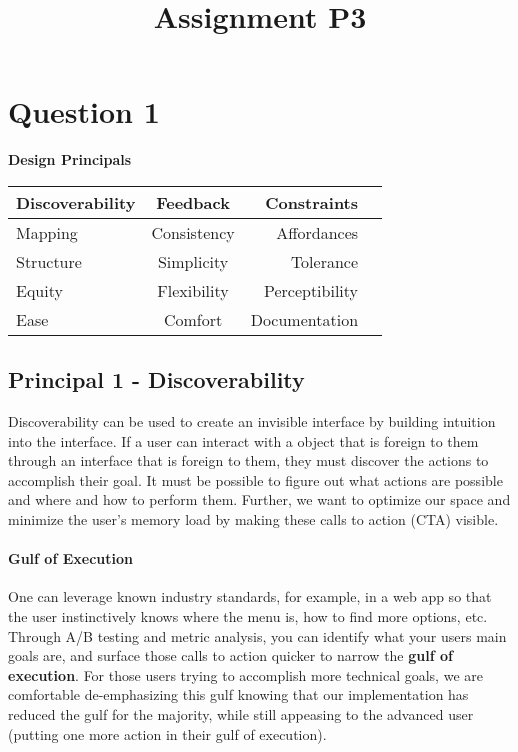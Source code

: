 

\title{Assignment P3\\}



\maketitle
\thispagestyle{fancy}

\section{Question 1}
\textbf{Design Principals}

\begin{table}[H]
  \centering
  \begin{tabular}{@{}lcrl@{}}
    Discoverability & Feedback & Constraints\\
    \midrule
    Mapping & Consistency & Affordances\\
    \midrule
    Structure & Simplicity & Tolerance\\
    \midrule
    Equity & Flexibility & Perceptibility\\
    \midrule
    Ease & Comfort & Documentation\\
    \midrule
  \end{tabular}
\end{table}

\subsection{Principal 1 - Discoverability}
Discoverability can be used to create an invisible interface by building intuition into the interface. If a user can interact with a object that is foreign to them through an interface that is foreign to them, they must discover the actions to accomplish their goal. It must be possible to figure out what actions are possible and where and how to perform them. Further, we want to optimize our space and minimize the user's memory load by making these calls to action (CTA) visible.

\paragraph{Gulf of Execution}
One can leverage known industry standards, for example, in a web app so that the user instinctively knows where the menu is, how to find more options, etc. Through A/B testing and metric analysis, you can identify what your users main goals are, and surface those calls to action quicker to narrow the \textbf{gulf of execution}. For those users trying to accomplish more technical goals, we are comfortable de-emphasizing this gulf knowing that our implementation has reduced the gulf for the majority, while still appeasing to the advanced user (putting one more action in their gulf of execution).

